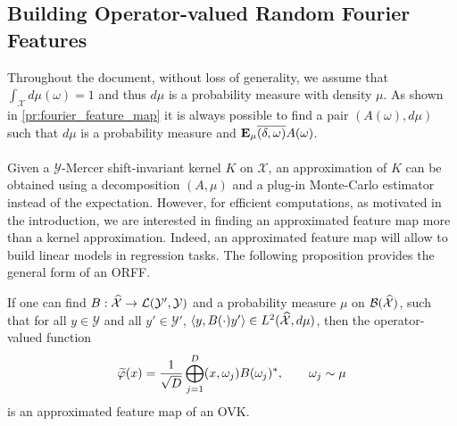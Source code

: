 \subsection{Building Operator-valued Random Fourier Features}
Throughout the document, without loss of generality, we assume that $\int_{\mathcal{X}} d\mu(\omega)=1$ and thus $d\mu$ is a probability measure with density $\mu$. As shown in \cref{pr:fourier_feature_map} it is always possible to find a pair $(A(\omega), d\mu)$ such that $d\mu$ is a probability measure and ${\mathbf{{E}}}_\mu{\overline{(\delta,\omega)}A(\omega)}$.
\paragraph{}
Given a $\mathcal{Y}$-Mercer shift-invariant kernel $K$ on $\mathcal{X}$, an approximation of $K$ can be obtained using a decomposition $(A, \mu)$ and a plug-in Monte-Carlo estimator instead of the expectation. However, for efficient computations, as motivated in the introduction, we are interested in finding an approximated feature map more than a kernel approximation. Indeed, an approximated feature map will allow to build linear models in regression tasks. The following proposition provides the general form of an \acl{ORFF}.
\begin{proposition}\label{pr:ORFF-map}If one can find $B: \widehat{\mathcal{X}} \to \mathcal{L}(\mathcal{Y}',\mathcal{Y})$ and a probability measure $\mu$ on $\mathcal{B}(\widehat{\mathcal{X}})$, such that for all $y\in\mathcal{Y}$ and all $y'\in\mathcal{Y}'$, $\langle y, B(\cdot)y'\rangle \in L^2(\widehat{\mathcal{X}}, d\mu)$, then the operator-valued function
\begin{equation}\label{eq:phitilde}
\tildePhi{1:D}(x)= \frac{1}{\sqrt{D}}\Vect_{j=1}^D\pairing{x, \omega_j}B(\omega_j)^\adjoint , \qquad \omega_j \sim \mu
\end{equation}
is an approximated feature map of an \acl{OVK}.
\end{proposition}
